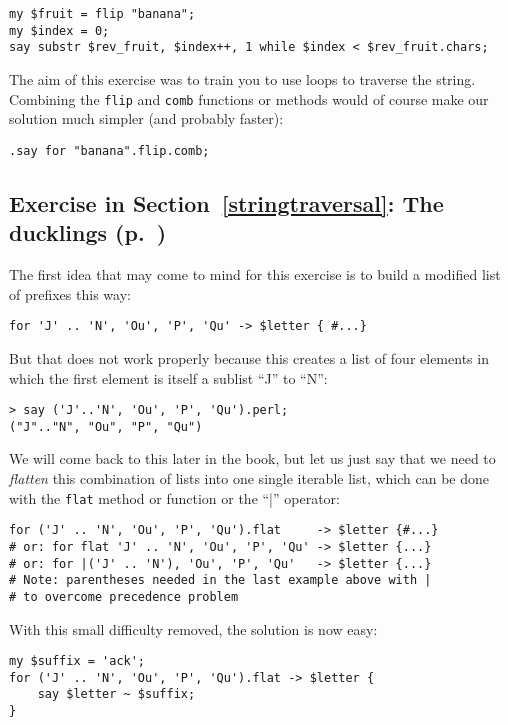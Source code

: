 \begin{verbatim}
my $fruit = flip "banana";
my $index = 0;
say substr $rev_fruit, $index++, 1 while $index < $rev_fruit.chars;
\end{verbatim}
%

The aim of this exercise was to train you to use loops to 
traverse the string. Combining the {\tt flip} and {\tt comb} 
functions or methods would of course make our solution much 
simpler (and probably faster):

\begin{verbatim}
.say for "banana".flip.comb;
\end{verbatim}


\subsection{Exercise in Section~\ref{stringtraversal}: The ducklings (p.~\pageref{stringtraversal})}
\label{sol_ducklings}

The first idea that may come to mind for this exercise is to build 
a modified list of prefixes this way:

\begin{verbatim}
for 'J' .. 'N', 'Ou', 'P', 'Qu' -> $letter { #...}
\end{verbatim}
%

But that does not work properly because this creates a list 
of four elements in which the first element is itself a 
sublist ``J'' to ``N'':

\begin{verbatim}
> say ('J'..'N', 'Ou', 'P', 'Qu').perl;
("J".."N", "Ou", "P", "Qu")
\end{verbatim}
%

We will come back to this later in the book, but let us just say 
that we need to \emph{flatten} this combination of lists into 
one single iterable list, which can be done with the 
{\tt flat} method or function or the ``|'' operator:

\begin{verbatim}
for ('J' .. 'N', 'Ou', 'P', 'Qu').flat     -> $letter {#...}
# or: for flat 'J' .. 'N', 'Ou', 'P', 'Qu' -> $letter {...}
# or: for |('J' .. 'N'), 'Ou', 'P', 'Qu'   -> $letter {...}
# Note: parentheses needed in the last example above with | 
# to overcome precedence problem
\end{verbatim}
%

With this small difficulty removed, the solution is now easy:

\begin{verbatim}
my $suffix = 'ack';
for ('J' .. 'N', 'Ou', 'P', 'Qu').flat -> $letter {
    say $letter ~ $suffix;
}
\end{verbatim}
%

